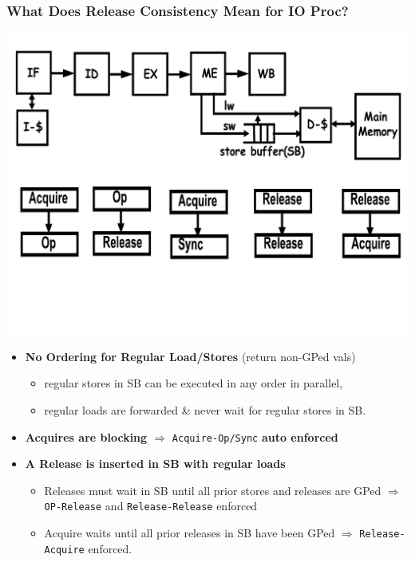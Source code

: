 \documentclass{beamer}
\renewcommand{\emph}[1]{\textcolor{structure}{#1}}
\newcommand{\emp}[1]{\textcolor{DikuRed}{ #1}}
\begin{document}
\begin{frame}[fragile,t]
\frametitle{What Does Release Consistency Mean for IO Proc?}
\vspace{-3ex}
\includegraphics[width=44ex]{Ch7Figs/ReleasedIOpipeOrd}
\vspace{-8ex}

\begin{itemize}
    \item \emph{\bf No Ordering for Regular Load/Stores} (return non-GPed vals)\smallskip
        \begin{itemize}
            \item regular stores in SB can be executed in any order in parallel,
            \item regular loads are forwarded \& never wait for regular stores in SB.
        \end  {itemize}

    \item \emph{\bf Acquires are blocking $\Rightarrow$} 
                \emp{\tt Acquire-Op/Sync} \emph{\bf auto enforced}\smallskip

    \item \emph{\bf A Release is inserted in SB with regular loads}
        \begin{itemize}
            \item Releases must wait in SB until all prior stores and releases are GPed
                    $\Rightarrow$ \emp{\tt OP-Release} and \emp{\tt Release-Release} enforced 
            \item Acquire waits until all prior releases in SB 
                    have been GPed $\Rightarrow$ \emp{\tt Release-Acquire} enforced.
        \end  {itemize}
\end{itemize}

\end{frame}
\end{document}
